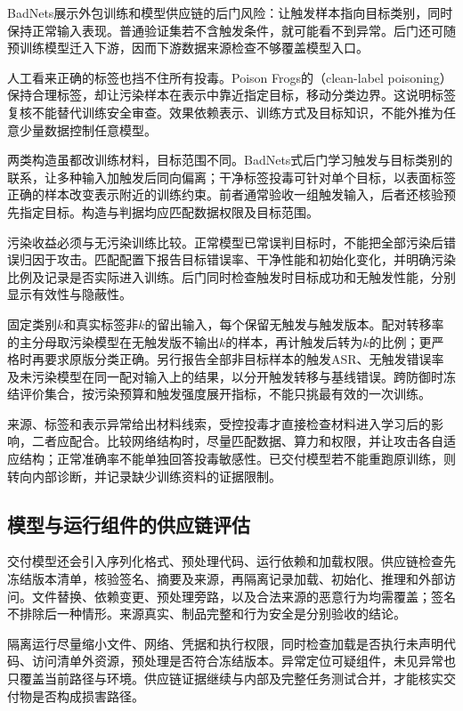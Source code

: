 BadNets展示外包训练和模型供应链的后门风险：让触发样本指向目标类别，同时保持正常输入表现。普通验证集若不含触发条件，就可能看不到异常。后门还可随预训练模型迁入下游，因而下游数据来源检查不够覆盖模型入口。

人工看来正确的标签也挡不住所有投毒。Poison Frogs的（clean-label poisoning）保持合理标签，却让污染样本在表示中靠近指定目标，移动分类边界。这说明标签复核不能替代训练安全审查。效果依赖表示、训练方式及目标知识，不能外推为任意少量数据控制任意模型。

两类构造虽都改训练材料，目标范围不同。BadNets式后门学习触发与目标类别的联系，让多种输入加触发后同向偏离；干净标签投毒可针对单个目标，以表面标签正确的样本改变表示附近的训练约束。前者通常验收一组触发输入，后者还核验预先指定目标。构造与判据均应匹配数据权限及目标范围。

污染收益必须与无污染训练比较。正常模型已常误判目标时，不能把全部污染后错误归因于攻击。匹配配置下报告目标错误率、干净性能和初始化变化，并明确污染比例及记录是否实际进入训练。后门同时检查触发时目标成功和无触发性能，分别显示有效性与隐蔽性。

固定类别$k$和真实标签非$k$的留出输入，每个保留无触发与触发版本。配对转移率的主分母取污染模型在无触发版不输出$k$的样本，再计触发后转为$k$的比例；更严格时再要求原版分类正确。另行报告全部非目标样本的触发ASR、无触发错误率及未污染模型在同一配对输入上的结果，以分开触发转移与基线错误。跨防御时冻结评价集合，按污染预算和触发强度展开指标，不能只挑最有效的一次训练。

来源、标签和表示异常给出材料线索，受控投毒才直接检查材料进入学习后的影响，二者应配合。比较网络结构时，尽量匹配数据、算力和权限，并让攻击各自适应结构；正常准确率不能单独回答投毒敏感性。已交付模型若不能重跑原训练，则转向内部诊断，并记录缺少训练资料的证据限制。

\subsection{模型与运行组件的供应链评估}
\label{sec:security-supply-chain-test}

交付模型还会引入序列化格式、预处理代码、运行依赖和加载权限。供应链检查先冻结版本清单，核验签名、摘要及来源，再隔离记录加载、初始化、推理和外部访问。文件替换、依赖变更、预处理旁路，以及合法来源的恶意行为均需覆盖；签名不排除后一种情形。来源真实、制品完整和行为安全是分别验收的结论。

隔离运行尽量缩小文件、网络、凭据和执行权限，同时检查加载是否执行未声明代码、访问清单外资源，预处理是否符合冻结版本。异常定位可疑组件，未见异常也只覆盖当前路径与环境。供应链证据继续与内部及完整任务测试合并，才能核实交付物是否构成损害路径。

